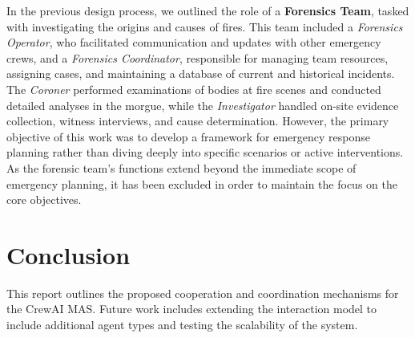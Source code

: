\documentclass[12pt,a4paper]{article}
\begin{document}
In the previous design process, we outlined the role of a \textbf{Forensics Team}, tasked with investigating the origins and causes 
of fires. This team included a \textit{Forensics Operator}, who facilitated communication and updates with other emergency crews, 
and a \textit{Forensics Coordinator}, responsible for managing team resources, assigning cases, and maintaining a database of current 
and historical incidents. The \textit{Coroner} performed examinations of bodies at fire scenes and conducted detailed analyses in the 
morgue, while the \textit{Investigator} handled on-site evidence collection, witness interviews, and cause determination. However, the 
primary objective of this work was to develop a framework for emergency response planning rather than diving deeply into specific 
scenarios or active interventions. As the forensic team’s functions extend beyond the immediate scope of emergency planning, it 
has been excluded in order to maintain the focus on the core objectives.











\section{Conclusion}
This report outlines the proposed cooperation and coordination mechanisms for the CrewAI MAS. Future work includes extending the interaction model to include additional agent types and testing the scalability of the system.
\end{document}
